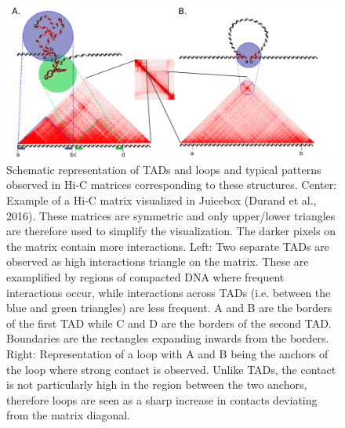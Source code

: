 \documentclass[11pt,a4paper]{report}
\begin{document}
\begin{figure}[ht]
	\includegraphics[width=1\textwidth]{Figures/3_TAD_loop_definition.pdf}
	\caption{Schematic representation of TADs and loops and typical patterns  observed in Hi-C matrices corresponding to these structures. Center:  Example of a Hi-C matrix visualized in Juicebox (Durand et al., 2016)⁠. These matrices are symmetric and only upper/lower triangles are therefore used to simplify the visualization. The darker pixels on the matrix contain more interactions. Left: Two separate TADs are observed as high interactions triangle on the matrix. These are examplified by regions of compacted DNA where frequent interactions occur, while interactions across TADs (i.e. between the blue and green triangles) are less frequent. A and B are the borders of the first TAD while C and D are the borders of the second TAD. Boundaries are the rectangles expanding inwards from the borders. Right: Representation of a loop with A and B being the anchors of the loop where strong contact is observed. Unlike TADs, the contact is not particularly high in the region between the two anchors, therefore loops are seen as a sharp increase in contacts deviating from the matrix diagonal. }
	\label{TAD_loop_def}
\end{figure}
\end{document}
